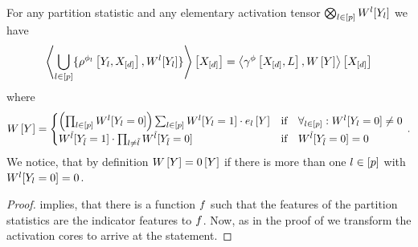 \begin{theorem}\label{the:selectionRepresentationPartitionStatistics}
    For any partition statistic and any elementary activation tensor $\bigotimes_{l\in[p]}W^{l}[Y_{l}]$ we have
    \begin{align*}
        \left\langle \bigcup_{l\in[p]}\{\rho^{\phi_{l}}\left[Y_{l},X_{[d]}\right],W^{l}[Y_{l}]\}\right\rangle \left[ X_{[d]} \right]
        = \left\langle \gamma^{\phi}\left[X_{[d]},L\right],W\left[Y\right]\right\rangle \left[ X_{[d]} \right]
    \end{align*}
    where
    \begin{align*}
        \actcoreat{\headvariable}
        =
        \begin{cases}
            \left(\prod_{\selindexin} \actcoreofat{\selindex}{\headvariableof{\selindex}=0} \right) \sum_{\selindexin}\actcoreofat{\selindex}{\headvariableof{\selindex}=1} \cdot \onehotmapofat{\selindex}{\headvariable}
            & \text{if} \quad \forall_{\selindexin} : \actcoreofat{\selindex}{\headvariableof{\selindex}=0}\neq 0 \\
            \actcoreofat{\secselindex}{\headvariableof{\secselindex}=1} \cdot \prod_{\selindex\neq\secselindex}\actcoreofat{\secselindex}{\headvariableof{\secselindex}=0}
            & \text{if} \quad \actcoreofat{\secselindex}{\headvariableof{\secselindex}=0}=0 %
        \end{cases} \, .
    \end{align*}
    We notice, that by definition $W\left[Y\right]=0\left[Y\right]$ if there is more than one $l\in[p]$ with $W^{l}[Y_{l}=0]=0$.
\end{theorem}
\begin{proof}
     implies, that there is a function $f$ such that the features of the partition statistics are the indicator features to $f$.
    Now, as in the proof of  we transform the activation cores to arrive at the statement.
\end{proof}

